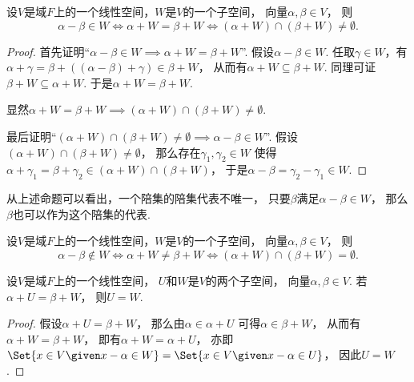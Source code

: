\begin{theorem}
设\(V\)是域\(F\)上的一个线性空间，\(W\)是\(V\)的一个子空间，
向量\(\alpha,\beta \in V\)，
则\begin{equation*}
	\alpha - \beta \in W
	\iff
	\alpha + W = \beta + W
	\iff
	(\alpha + W) \cap (\beta + W) \neq \emptyset.
\end{equation*}
\begin{proof}
首先证明“\(
	\alpha - \beta \in W
	\implies
	\alpha + W = \beta + W
\)”.
假设\(\alpha - \beta \in W\).
任取\(\gamma \in W\)，有\(
	\alpha + \gamma
	= \beta + ((\alpha - \beta) + \gamma)
	\in \beta + W
\)，
从而有\(\alpha + W \subseteq \beta + W\).
同理可证\(\beta + W \subseteq \alpha + W\).
于是\(\alpha + W = \beta + W\).

显然\(
	\alpha + W = \beta + W
	\implies
	(\alpha + W) \cap (\beta + W) \neq \emptyset
\).

最后证明“\(
	(\alpha + W) \cap (\beta + W) \neq \emptyset
	\implies
	\alpha - \beta \in W
\)”.
假设\((\alpha + W) \cap (\beta + W) \neq \emptyset\)，
那么存在\(\gamma_1,\gamma_2 \in W\)
使得\(\alpha + \gamma_1 = \beta + \gamma_2 \in (\alpha + W) \cap (\beta + W)\)，
于是\(\alpha - \beta = \gamma_2 - \gamma_1 \in W\).
\end{proof}
\end{theorem}
\begin{remark}
从上述命题可以看出，一个陪集的陪集代表不唯一，
只要\(\beta\)满足\(\alpha-\beta \in W\)，
那么\(\beta\)也可以作为这个陪集的代表.
\end{remark}

\begin{corollary}
设\(V\)是域\(F\)上的一个线性空间，\(W\)是\(V\)的一个子空间，
向量\(\alpha,\beta \in V\)，
则\begin{equation*}
	\alpha - \beta \notin W
	\iff
	\alpha + W \neq \beta + W
	\iff
	(\alpha + W) \cap (\beta + W) = \emptyset.
\end{equation*}
\end{corollary}

\begin{proposition}
设\(V\)是域\(F\)上的一个线性空间，
\(U\)和\(W\)是\(V\)的两个子空间，
向量\(\alpha,\beta \in V\).
若\(\alpha + U = \beta + W\)，
则\(U = W\).
\begin{proof}
假设\(\alpha + U = \beta + W\)，
那么由\(\alpha \in \alpha + U\)
可得\(\alpha \in \beta + W\)，
从而有\(\alpha + W = \beta + W\)，
即有\(\alpha + W = \alpha + U\)，
亦即\(
	\Set{
		x \in V
		\given
		x - \alpha \in W
	}
	= \Set{
		x \in V
		\given
		x - \alpha \in U
	}
\)，
因此\(U = W\).
\end{proof}
\end{proposition}

